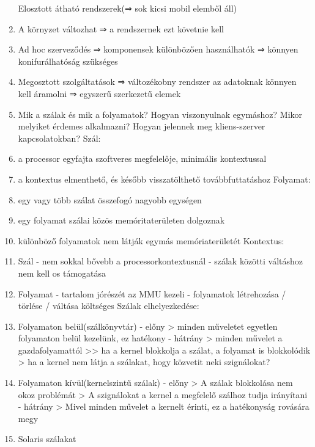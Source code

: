 \documentclass[twoside, a4paper, 12pt]{article}
\begin{document}
\begin{enumerate}
                Elosztott átható rendszerek(⇒ sok kicsi mobil elemből áll)
            \item A környzet változhat ⇒ a rendszernek ezt követnie kell
            \item Ad hoc szerveződés ⇒ komponensek különbözően használhatók ⇒ könnyen konifurálhatóság szükséges
            \item Megosztott szolgáltatások ⇒ változékobny rendszer az adatoknak könnyen kell áramolni ⇒ egyszerű szerkezetű elemek
            \item  Mik a szálak és mik a folyamatok? Hogyan viszonyulnak egymáshoz? Mikor melyiket érdemes alkalmazni? Hogyan jelennek meg kliens-szerver kapcsolatokban?	
                Szál:
            \item a processor egyfajta szoftveres megfelelője, minimális kontextussal
            \item a kontextus elmenthető, és később visszatölthető továbbfuttatáshoz 
                Folyamat:
            \item egy vagy több szálat összefogó nagyobb egységen
            \item egy folyamat szálai közös memóritaterületen dolgoznak
            \item különböző folyamatok nem látják egymás memóriaterületét
                Kontextus:
            \item Szál
                - nem sokkal bővebb a processorkontextusnál
                - szálak közötti váltáshoz nem kell os támogatása
            \item Folyamat
                - tartalom jórészét az MMU kezeli
                - folyamatok létrehozása / törlése / váltása költséges 
                Szálak elhelyezkedése:
            \item Folyamaton belül(szálkönyvtár)
                - előny
                > minden műveletet egyetlen folyamaton belül kezelünk, ez hatékony
                - hátrány
                > minden művelet a gazdafolyamattól >> ha a kernel blokkolja a szálat, a folyamat is blokkolódik
                > ha a kernel nem látja a szálakat, hogy közvetit neki szignálokat?
            \item Folyamaton kívül(kernelszintű szálak)
                - előny
                > A szálak blokkolása nem okoz problémát
                > A szignálokat a kernel a megfelelő szálhoz tudja irányítani
                - hátrány
                > Mivel minden művelet a kernelt érinti, ez a hatékonyság rovására megy
            \item Solaris szálakat

\end{enumerate}
\end{document}
